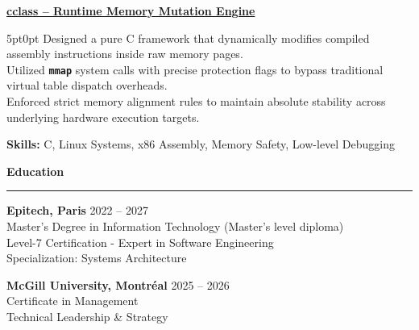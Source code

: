 \documentclass[9pt]{extarticle}
\begin{document}
\underline{\bfseries cclass -- Runtime Memory Mutation Engine}
\par
\begin{adjustwidth}{5pt}{0pt}
    Designed a pure C framework that dynamically modifies compiled assembly instructions inside raw memory pages. \\
    Utilized {\bfseries \texttt{mmap}} system calls with precise protection flags to bypass traditional virtual table dispatch overheads. \\
    Enforced strict memory alignment rules to maintain absolute stability across underlying hardware execution targets.
\end{adjustwidth}
\par
{\bfseries Skills:} C, Linux Systems, x86 Assembly, Memory Safety, Low-level Debugging

\par\vspace{5pt}

{\large\bfseries Education}
\par\vspace{-8pt}
\rule{\linewidth}{0.4pt}
\par\vspace{5pt}

{\bfseries Epitech, Paris} \hfill 2022 -- 2027 \\
Master's Degree in Information Technology (Master's level diploma) \\
Level-7 Certification - Expert in Software Engineering \\
Specialization: Systems Architecture \\

\vspace{4pt}

{\bfseries McGill University, Montréal} \hfill 2025 -- 2026 \\
Certificate in Management \\
Technical Leadership \& Strategy
\end{document}
